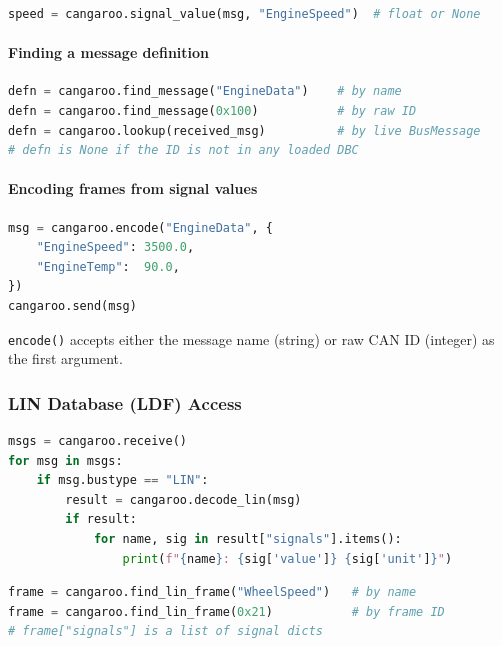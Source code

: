\documentclass[a4paper,11pt]{article}
\begin{document}
\begin{lstlisting}[language=Python]
speed = cangaroo.signal_value(msg, "EngineSpeed")  # float or None
\end{lstlisting}

\paragraph{Finding a message definition}

\begin{lstlisting}[language=Python]
defn = cangaroo.find_message("EngineData")    # by name
defn = cangaroo.find_message(0x100)           # by raw ID
defn = cangaroo.lookup(received_msg)          # by live BusMessage
# defn is None if the ID is not in any loaded DBC
\end{lstlisting}

\paragraph{Encoding frames from signal values}

\begin{lstlisting}[language=Python, caption={Build and send a frame by signal name}]
msg = cangaroo.encode("EngineData", {
    "EngineSpeed": 3500.0,
    "EngineTemp":  90.0,
})
cangaroo.send(msg)
\end{lstlisting}

\texttt{encode()} accepts either the message name (string) or raw CAN ID (integer)
as the first argument.

\subsubsection{LIN Database (LDF) Access}

\begin{lstlisting}[language=Python, caption={Decode a received LIN frame}]
msgs = cangaroo.receive()
for msg in msgs:
    if msg.bustype == "LIN":
        result = cangaroo.decode_lin(msg)
        if result:
            for name, sig in result["signals"].items():
                print(f"{name}: {sig['value']} {sig['unit']}")
\end{lstlisting}

\begin{lstlisting}[language=Python, caption={Look up a LIN frame definition}]
frame = cangaroo.find_lin_frame("WheelSpeed")   # by name
frame = cangaroo.find_lin_frame(0x21)           # by frame ID
# frame["signals"] is a list of signal dicts
\end{lstlisting}
\end{document}
